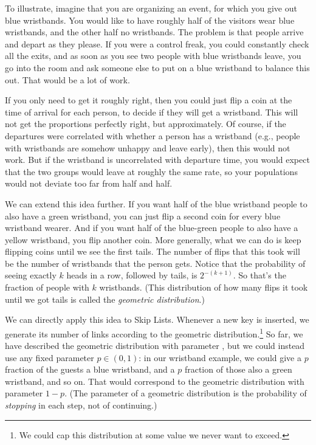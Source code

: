 To illustrate, imagine that you are organizing an event, for which you
give out blue wristbands. You would like to have roughly half of
the visitors wear blue wristbands, and the other half no wristbands.
The problem is that people arrive and depart as they please.
If you were a control freak, you could constantly check all the exits,
and as soon as you see two people with blue wristbands leave, you go
into the room and ask someone else to put on a blue wristband to
balance this out. That would be a lot of work.

If you only need to get it roughly right, then you could just flip a
coin at the time of arrival for each person, to decide if they will
get a wristband.
This will not get the proportions perfectly right, but approximately.
Of course, if the departures were correlated with whether a person has
a wristband (e.g., people with wristbands are somehow unhappy and leave
early), then this would not work. But if the wristband is
uncorrelated with departure time, you would expect that the two groups
would leave at roughly the same rate, so your populations would not
deviate too far from half and half.

We can extend this idea further. If you want half of the blue
wristband people to also have a green wristband, you can just flip a
second coin for every blue wristband wearer. And if you want half of
the blue-green people to also have a yellow wristband, you flip
another coin. More generally, what we can do is keep flipping coins
until we see the first tails. The number of flips that this took will
be the number of wristbands that the person gets. Notice that the
probability of seeing exactly $k$ heads in a row, followed by tails,
is $2^{-(k+1)}$. So that's the fraction of people with $k$
wristbands. (This distribution of how many flips it took until we got
tails is called the \emph{geometric distribution}.)

We can directly apply this idea to Skip Lists. Whenever a new key is
inserted, we generate its number of links according to the geometric
distribution.\footnote{We could cap this distribution at some value we
  never want to exceed.} 
So far, we have described the geometric distribution with parameter
\half, but we could instead use any fixed parameter $p \in (0,1)$: in
our wristband example, we could give a $p$ fraction of the guests a
blue wristband, and a $p$ fraction of those also a green wristband,
and so on. That would correspond to the geometric distribution with
parameter $1-p$.  
(The parameter of a geometric distribution is the probability of
\emph{stopping} in each step, not of continuing.)

